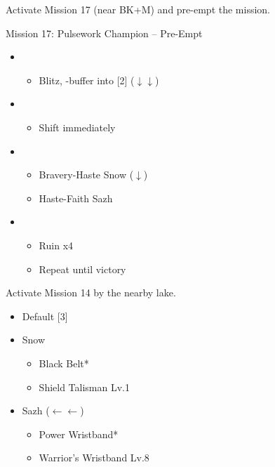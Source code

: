 Activate Mission 17 (near BK+M) and pre-empt the mission.

\begin{battle}{Mission 17: Pulsework Champion -- Pre-Empt}
	\begin{itemize}
		\item \sixth
			\begin{itemize}
				\item Blitz, \rav-buffer into [2] ($\downarrow\downarrow$)
			\end{itemize}
		\item \second
			\begin{itemize}
				\item Shift immediately
			\end{itemize}
		\item \first
			\begin{itemize}
				\item Bravery-Haste Snow ($\downarrow$)
				\item Haste-Faith Sazh
			\end{itemize}
		\item \fifth
			\begin{itemize}
				\item Ruin x4
				\item Repeat until victory
			\end{itemize}
	\end{itemize}
\end{battle}

Activate Mission 14 by the nearby lake.

\begin{menu}
	\begin{itemize}
		\paradigm
		\begin{itemize}
			\item Default [3]
		\end{itemize}
		\equip
		\begin{itemize}
			\item Snow
			    \begin{itemize}
				    \item Black Belt*
				    \item Shield Talisman Lv.1
			    \end{itemize}
			\item Sazh ($\leftarrow\leftarrow$)
				\begin{itemize}
					\item Power Wristband*
					\item Warrior's Wristband Lv.8
				\end{itemize}
		\end{itemize}
	\end{itemize}
\end{menu}

